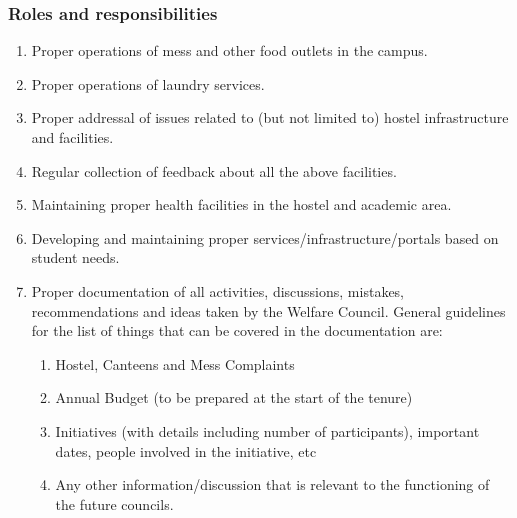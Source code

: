 \documentclass[12pt]{article}
\begin{document}
\subsubsection{Roles and responsibilities}
\begin{enumerate}
    \item Proper operations of mess and other food outlets in the campus.
    \item Proper operations of laundry services.
    \item Proper addressal of issues related to (but not limited to) hostel infrastructure and facilities.
    \item Regular collection of feedback about all the above facilities.
    \item Maintaining proper health facilities in the hostel and academic area.
    \item Developing and maintaining proper services/infrastructure/portals based on student needs.
    \item Proper documentation of all activities, discussions, mistakes, recommendations and ideas taken by the Welfare Council. General guidelines for the list of things that can be covered in the documentation are:
    \begin{enumerate}
        \item Hostel, Canteens and Mess Complaints
        \item Annual Budget (to be prepared at the start of the tenure)
        \item Initiatives (with details including number of participants), important dates, people involved in the initiative, etc
        \item Any other information/discussion that is relevant to the functioning of the future councils.
    \end{enumerate}
\end{enumerate}
\end{document}
